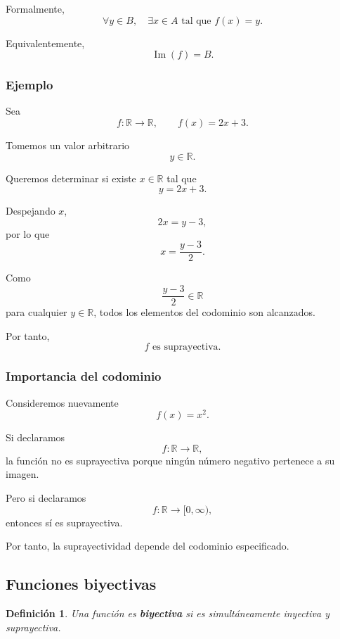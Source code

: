 \documentclass[12pt]{article}
\newtheorem{definicion}{Definición}[section]
\theoremstyle{remark}
\begin{document}
Formalmente,
\[
\boxed{
\forall y\in B,\quad
\exists x\in A
\text{ tal que }
f(x)=y.
}
\]

Equivalentemente,
\[
\boxed{
\operatorname{Im}(f)=B.
}
\]

\subsubsection{Ejemplo}

Sea
\[
f:\mathbb{R}\longrightarrow\mathbb{R},
\qquad
f(x)=2x+3.
\]

Tomemos un valor arbitrario
\[
y\in\mathbb{R}.
\]

Queremos determinar si existe \(x\in\mathbb{R}\) tal que
\[
y=2x+3.
\]

Despejando \(x\),
\[
2x=y-3,
\]
por lo que
\[
x=\frac{y-3}{2}.
\]

Como
\[
\frac{y-3}{2}\in\mathbb{R}
\]
para cualquier \(y\in\mathbb{R}\), todos los elementos del codominio
son alcanzados.

Por tanto,
\[
\boxed{f\text{ es suprayectiva}.}
\]

\subsubsection{Importancia del codominio}

Consideremos nuevamente
\[
f(x)=x^2.
\]

Si declaramos
\[
f:\mathbb{R}\longrightarrow\mathbb{R},
\]
la función no es suprayectiva porque ningún número negativo pertenece
a su imagen.

Pero si declaramos
\[
f:\mathbb{R}\longrightarrow[0,\infty),
\]
entonces sí es suprayectiva.

Por tanto, la suprayectividad depende del codominio especificado.

\subsection{Funciones biyectivas}

\begin{definicion}
Una función es \textbf{biyectiva} si es simultáneamente
inyectiva y suprayectiva.
\end{definicion}
\end{document}

